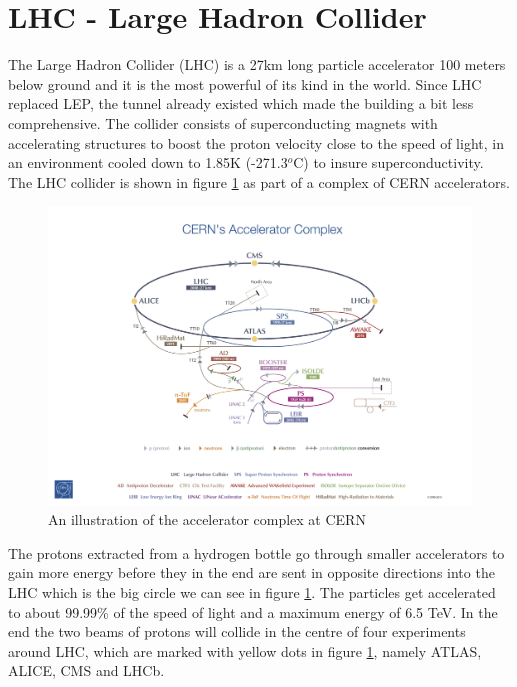 \section{LHC - Large Hadron Collider}
\label{sec:LHC}

The Large Hadron Collider (LHC) \cite{LHCcern} is a 27km long particle accelerator 100 meters below ground and it is the most powerful of its kind in the world. Since LHC replaced LEP, the tunnel already existed which made the building a bit less comprehensive. The collider consists of superconducting magnets with accelerating structures to boost the proton velocity close to the speed of light, in an environment cooled down to 1.85K (-271.3$^o$C) to insure superconductivity. The LHC collider is shown in figure \ref{fig:LHC} as part of a complex of CERN accelerators. 

\begin{figure}[H]
    \centering
    \includegraphics[width=\textwidth]{Figures/FromOnline/Poster-2013-377.jpg}
    \caption{An illustration of the accelerator complex at CERN \cite{LHCpic}}
    \label{fig:LHC}
\end{figure}

The protons extracted from a hydrogen bottle go through smaller accelerators to gain more energy before they in the end are sent in opposite directions into the LHC which is the big circle we can see in figure \ref{fig:LHC}. The particles get accelerated to about 99.99\% of the speed of light and a maximum energy of 6.5 TeV. In the end the two beams of protons will collide in the centre of four experiments around LHC, which are marked with yellow dots in figure \ref{fig:LHC}, namely ATLAS, ALICE, CMS and LHCb. 


